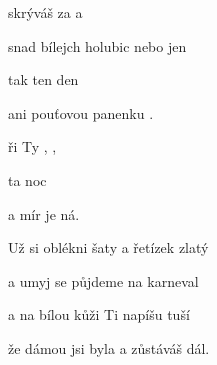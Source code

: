 

      

\zs
{} skrýváš za  a  

snad  bílejch holubic nebo jen 

tak  ten  den  

ani pouťovou panenku .
\ks

\zr
{}ři  Ty ,  ,

  ta  noc 

a mír je  ná.
\kr

\zs
Už si oblékni šaty a řetízek zlatý

a umyj se půjdeme na karneval

a na bílou kůži Ti napíšu tuší

že dámou jsi byla a zůstáváš dál.
\ks

\zr  \kr

\kp






















